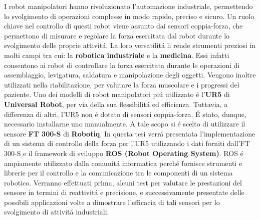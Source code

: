 I robot manipolatori hanno rivoluzionato l'automazione industriale, permettendo lo svolgimento
di operazioni complesse in modo rapido, preciso e sicuro.
Un ruolo chiave nel controllo di questi robot viene assunto dai sensori coppia-forza,
che permettono di misurare e regolare la forza esercitata dal robot durante lo svolgimento delle proprie attivit\'{a}. 
La loro versatilit\'{a} li rende strumenti preziosi in molti campi tra cui: la \textbf{robotica industriale} e la \textbf{medicina}. 
Essi infatti consentono ai robot di controllare la forza esercitata durante le operazioni di assemblaggio, levigatura, 
saldatura e manipolazione degli oggetti. Vengono inoltre utilizzati nella riabilitazione, per valutare la forza muscolare 
e i progressi del paziente.
Uno dei modelli di robot manipolatori pi\'{u} utilizzato \'{e} l'\textbf{UR5} di \textbf{Universal Robot}, per via della sua flessibilit\'{a} 
ed efficienza.
Tuttavia, a differenza di altri, l'UR5 non \'{e} dotato di sensori coppia-forza.
\'{E} stato, dunque, necessario installarne uno manualmente. 
A tale scopo si \'{e} scelto di utilizzare il sensore \textbf{FT 300-S} 
di \textbf{Robotiq}. 
In questa tesi verr\'{a} presentata l'implementazione di un sistema di controllo della forza per l'UR5 utilizzando i dati
forniti dall'FT 300-S e il framework di sviluppo \textbf{ROS (Robot Operating System)}.
ROS \'{e} ampiamente utilizzato dalla comunit\'{a} informatica perch\'{e} fornisce strumenti e librerie 
per il controllo e la comunicazione tra le componenti di un sistema robotico.
Verranno effettuati prima, alcuni test per valutare le prestazioni del sensore in termini di reattivit\'{a} e precisione, 
e successivamente presentate delle possibili applicazioni volte a dimostrare l'efficacia
di tali sensori per lo svolgimento di attivit\'{a} industriali.
